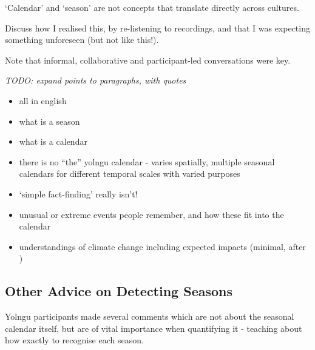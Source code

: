 `Calendar' and `season' are not concepts that translate directly across cultures. 

Discuss how I realised this, by re-listening to recordings, and that I was
expecting something unforeseen (but not like this!).

Note that informal, collaborative and participant-led conversations were key.

\emph{TODO: expand points to paragraphs, with quotes}

\begin{itemize}
\item all in english
\item what is a season
\item what is a calendar
\item there is no ``the'' yolngu calendar - varies spatially,
        multiple seasonal calendars for different temporal scales with varied purposes
\item `simple fact-finding' really isn't!
\item unusual or extreme events people remember, and how these fit into the calendar
\item understandings of climate change including expected impacts (minimal, after \citet{petheram2010})
\end{itemize}


\subsection{Other Advice on Detecting Seasons}
\label{subsec:detection-advice}
Yolngu participants made several comments which are not about
the seasonal calendar itself, but are of vital importance when quantifying
it - teaching about how exactly to recognise each season.

